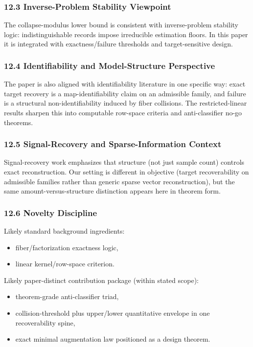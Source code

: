 \documentclass[11pt]{article}
\begin{document}
\subsubsection*{12.3 Inverse-Problem Stability Viewpoint}
The collapse-modulus lower bound is consistent with inverse-problem stability logic: indistinguishable records impose irreducible estimation floors. In this paper it is integrated with exactness/failure thresholds and target-sensitive design.


\subsubsection*{12.4 Identifiability and Model-Structure Perspective}
The paper is also aligned with identifiability literature in one specific way: exact target recovery is a map-identifiability claim on an admissible family, and failure is a structural non-identifiability induced by fiber collisions. The restricted-linear results sharpen this into computable row-space criteria and anti-classifier no-go theorems.


\subsubsection*{12.5 Signal-Recovery and Sparse-Information Context}
Signal-recovery work emphasizes that structure (not just sample count) controls exact reconstruction. Our setting is different in objective (target recoverability on admissible families rather than generic sparse vector reconstruction), but the same amount-versus-structure distinction appears here in theorem form.


\subsubsection*{12.6 Novelty Discipline}
Likely standard background ingredients:

\begin{itemize}
\item fiber/factorization exactness logic,
\item linear kernel/row-space criterion.
\end{itemize}

Likely paper-distinct contribution package (within stated scope):

\begin{itemize}
\item theorem-grade anti-classifier triad,
\item collision-threshold plus upper/lower quantitative envelope in one recoverability spine,
\item exact minimal augmentation law positioned as a design theorem.
\end{itemize}
\end{document}
